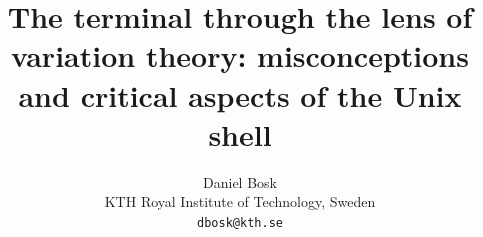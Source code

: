 \documentclass[a4paper,10pt,article,oneside,oldfontcommands]{memoir}
\title{%
  The terminal through the lens of variation theory:
  misconceptions and critical aspects of the Unix shell%
}
\author{%
  Daniel Bosk
  \\KTH Royal Institute of Technology, Sweden
  \\\texttt{dbosk@kth.se}
}
\begin{document}
\maketitle
\begin{abstract}
  
\end{abstract}

\clearpage
\tableofcontents
\clearpage














\printbibliography

\appendix



\end{document}
